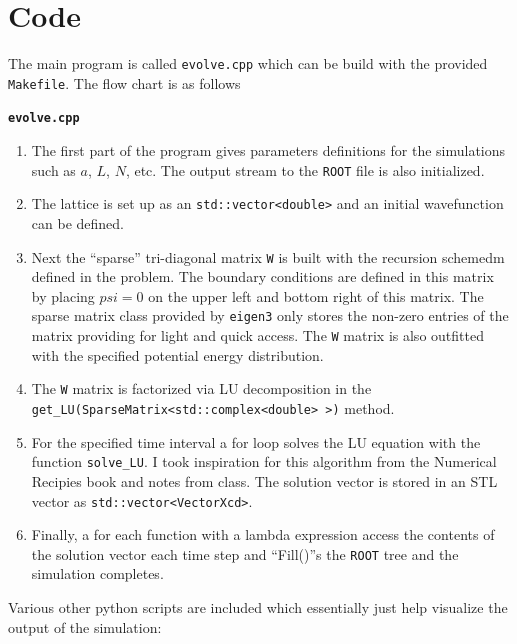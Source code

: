 \documentclass[singlepage,notitlepage,nofootinbib,11pt]{revtex4-1}
\begin{document}
\section*{Code}
The main program is called \texttt{evolve.cpp} which can be build with the provided \texttt{Makefile}. The flow chart is as follows
\begin{center}{\bf \texttt{evolve.cpp}}\end{center}
\begin{enumerate}
\item  The first part of the program gives parameters definitions for the simulations such as $a$, $L$, $N$, etc. The output stream to the \texttt{ROOT} file is also initialized.
\item The lattice is set up as an \texttt{std::vector<double>} and an initial wavefunction can be defined.
\item Next the ``sparse'' tri-diagonal matrix \texttt{W} is built with the recursion schemedm defined in the problem. The boundary conditions are defined in this matrix by placing $psi=0$ on the upper left and bottom right of this matrix. The sparse matrix class provided by \texttt{eigen3} only stores the non-zero entries of the matrix providing for light and quick access. The \texttt{W} matrix is also outfitted with the specified potential energy distribution.
\item The \texttt{W} matrix is factorized via LU decomposition in the\\ \texttt{get\_LU(SparseMatrix<std::complex<double> >)} method.
\item For the specified time interval a for loop solves the LU equation with the function \texttt{solve\_LU}. I took inspiration for this algorithm from the Numerical Recipies book and notes from class. The solution vector is stored in an STL vector as \texttt{std::vector<VectorXcd>}.
  \item Finally, a for each function with a lambda expression access the contents of the solution vector each time step and ``Fill()''s the \texttt{ROOT} tree and the simulation completes.
\end{enumerate}
Various other python scripts are included which essentially just help visualize the output of the simulation:
\end{document}
